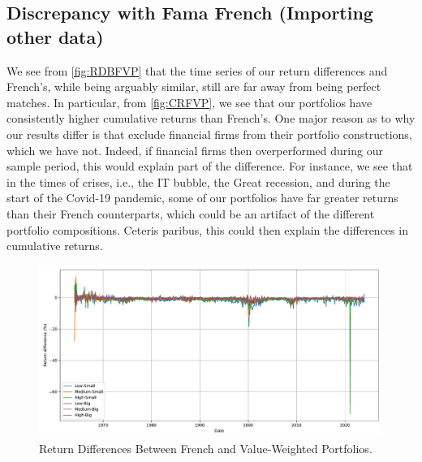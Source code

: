 \documentclass[a4paper,10pt,american]{article}
\begin{document}
\subsection*{Discrepancy with Fama French (Importing other data)}

We see from \autoref{fig:RDBFVP} that the time series of our return
differences and French's, while being arguably similar, still are far 
away from being perfect matches. In particular, from \autoref{fig:CRFVP}, 
we see that our portfolios have consistently higher cumulative returns 
than French's. One major reason as to why our results differ is that 
\cite{fama1992cross} exclude financial firms from their portfolio constructions, 
which we have not. Indeed, if financial firms then overperformed during our 
sample period, this would explain part of the difference. For instance, 
we see that in the times of crises, i.e., the IT bubble, the Great 
recession, and during the start of the Covid-19 pandemic, some of our 
portfolios have far greater returns than their French counterparts,
which could be an artifact of the different portfolio 
compositions. Ceteris paribus, this could then explain the differences 
in cumulative returns.

\begin{figure}[H]
\centering
\includegraphics[width=1\linewidth]{../Plots/return_diff.pdf}
\caption{Return Differences Between French and Value-Weighted Portfolios.}
\label{fig:RDBFVP}
\end{figure}
\end{document}
